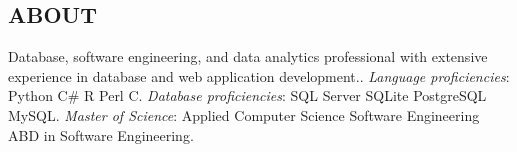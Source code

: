 \documentclass[margin, 10pt]{res} %
\begin{document}
\begin{resume}

 
\section{ABOUT}  

    Database, software engineering, and data analytics professional with extensive experience in database and web application development.. 
    \textit{Language proficiencies}:  Python \textpipe{}  C\# \textpipe{}   \textsf{R} \textpipe{}      Perl \textpipe{}    C. 
    \textit{Database proficiencies}: SQL Server \textpipe{}    SQLite \textpipe{}    PostgreSQL \textpipe{}    MySQL. 
    \textit{Master of Science}: Applied Computer Science \textpipe{}    Software Engineering \textpipe{}   
    ABD in Software Engineering. 





\end{resume}
\end{document}

